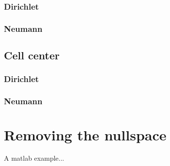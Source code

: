 \documentclass[landscape]{article}
\begin{document}
\subsubsection{Dirichlet}
\subsubsection{Neumann}
\subsection{Cell center}
\subsubsection{Dirichlet}
\subsubsection{Neumann}

\newpage
\section{Removing the nullspace}
A matlab example...
\end{document}
